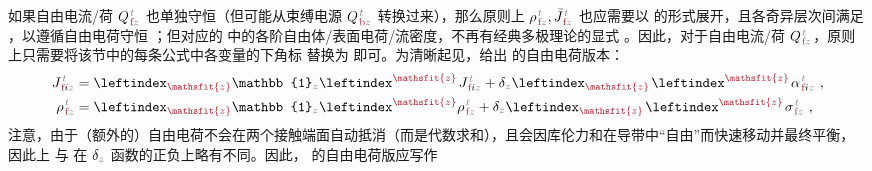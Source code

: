 如果自由电流/荷 ${Q}^{\;\!\mathcolor{gray}{t}}_{\;\!\textcolor{Maroon}{\text{f}}\mathcolor{gray}{z}}$ 也单独守恒（但可能从束缚电源 ${Q}^{\;\!\mathcolor{gray}{t}}_{\;\!\textcolor{Maroon}{\text{b}}\mathcolor{gray}{z}}$ 转换过来），那么原则上 ${\rho}^{\;\!\mathcolor{gray}{t}}_{\;\!\textcolor{Maroon}{\text{f}}\mathcolor{gray}{z}},\bar{J}^{\;\!\mathcolor{gray}{t}}_{\;\!\textcolor{Maroon}{\text{f}}\mathcolor{gray}{z}}$ 也应需要以  的形式展开，且各奇异层次间满足 ，以遵循自由电荷守恒 ；但对应的  中的各阶自由体/表面电荷/流密度，不再有经典多极理论的显式 。因此，对于自由电流/荷 ${Q}^{\;\!\mathcolor{gray}{t}}_{\;\!\textcolor{Maroon}{\text{f}}\mathcolor{gray}{z}}$，原则上只需要将该节中的每条公式中各变量的下角标 \textcolor{Maroon}{} 替换为 \textcolor{Maroon}{} 即可。为清晰起见，给出  的自由电荷版本：
\begin{subequations} \label{eq:e-f-01}
\begin{align}
	J^{\;\!\mathcolor{gray}{t}}_{\;\!\textcolor{Maroon}{\text{f}} i\mathcolor{gray}{z}} &= \leftindex_{\textcolor{Maroon}{\mathsfit{z}}} {\mathbb{1}}_{\mathcolor{gray}{z}} \leftindex^{\textcolor{Maroon}{\mathsfit{z}}} \;\! J^{\;\!\mathcolor{gray}{t}}_{\;\!\textcolor{Maroon}{\text{f}} i\mathcolor{gray}{z}} + \delta_{\mathcolor{gray}{z}} \leftindex_{\textcolor{Maroon}{\mathsfit{z}}} \;\! \leftindex^{\textcolor{Maroon}{\mathsfit{z}}} \;\!
	{\alpha}^{\;\!\mathcolor{gray}{t}}_{\;\!\textcolor{Maroon}{\text{f}} i\mathcolor{gray}{z}} ~, \label{eq:j-f-01} \\
	{\rho}^{\;\!\mathcolor{gray}{t}}_{\;\!\textcolor{Maroon}{\text{f}}\mathcolor{gray}{z}} &= \leftindex_{\textcolor{Maroon}{\mathsfit{z}}} {\mathbb{1}}_{\mathcolor{gray}{z}} \leftindex^{\textcolor{Maroon}{\mathsfit{z}}} {\rho}^{\;\!\mathcolor{gray}{t}}_{\;\!\textcolor{Maroon}{\text{f}}\mathcolor{gray}{z}} + \delta_{\mathcolor{gray}{z}} \leftindex_{\textcolor{Maroon}{\mathsfit{z}}} \;\! \leftindex^{\textcolor{Maroon}{\mathsfit{z}}} \;\! {\sigma}^{\;\!\mathcolor{gray}{t}}_{\;\!\textcolor{Maroon}{\text{f}} \mathcolor{gray}{z}} ~, \label{eq:p-f-01}
\end{align}
\end{subequations}
注意，由于（额外的）自由电荷不会在两个接触端面自动抵消（而是代数求和），且会因库伦力和在导带中“自由”而快速移动并最终平衡，因此上  与  在 $\delta_{\mathcolor{gray}{z}}$ 函数的正负上略有不同。因此，  的自由电荷版应写作
